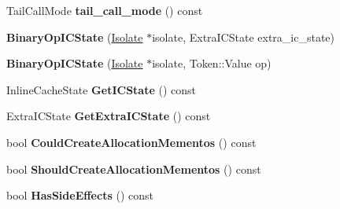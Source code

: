 \begin{DoxyCompactItemize}
\item 
Tail\+Call\+Mode {\bfseries tail\+\_\+call\+\_\+mode} () const \hypertarget{classv8_1_1internal_1_1_b_a_s_e___e_m_b_e_d_d_e_d_ad1a50ff8828b633418963d4654760353}{}\label{classv8_1_1internal_1_1_b_a_s_e___e_m_b_e_d_d_e_d_ad1a50ff8828b633418963d4654760353}

\item 
{\bfseries Binary\+Op\+I\+C\+State} (\hyperlink{classv8_1_1internal_1_1_isolate}{Isolate} $\ast$isolate, Extra\+I\+C\+State extra\+\_\+ic\+\_\+state)\hypertarget{classv8_1_1internal_1_1_b_a_s_e___e_m_b_e_d_d_e_d_af69e740d0ac5b36a5ac81724f1037f60}{}\label{classv8_1_1internal_1_1_b_a_s_e___e_m_b_e_d_d_e_d_af69e740d0ac5b36a5ac81724f1037f60}

\item 
{\bfseries Binary\+Op\+I\+C\+State} (\hyperlink{classv8_1_1internal_1_1_isolate}{Isolate} $\ast$isolate, Token\+::\+Value op)\hypertarget{classv8_1_1internal_1_1_b_a_s_e___e_m_b_e_d_d_e_d_a1c946ba234d1d11ab706121eab1367c6}{}\label{classv8_1_1internal_1_1_b_a_s_e___e_m_b_e_d_d_e_d_a1c946ba234d1d11ab706121eab1367c6}

\item 
Inline\+Cache\+State {\bfseries Get\+I\+C\+State} () const \hypertarget{classv8_1_1internal_1_1_b_a_s_e___e_m_b_e_d_d_e_d_a0e90a4dedf9d813e67f95773ce8f9f8f}{}\label{classv8_1_1internal_1_1_b_a_s_e___e_m_b_e_d_d_e_d_a0e90a4dedf9d813e67f95773ce8f9f8f}

\item 
Extra\+I\+C\+State {\bfseries Get\+Extra\+I\+C\+State} () const \hypertarget{classv8_1_1internal_1_1_b_a_s_e___e_m_b_e_d_d_e_d_af7260d1f010f4e6a7e3f6384dc5cd5ca}{}\label{classv8_1_1internal_1_1_b_a_s_e___e_m_b_e_d_d_e_d_af7260d1f010f4e6a7e3f6384dc5cd5ca}

\item 
bool {\bfseries Could\+Create\+Allocation\+Mementos} () const \hypertarget{classv8_1_1internal_1_1_b_a_s_e___e_m_b_e_d_d_e_d_a540425eb6389443930aa8d9ff7fa0279}{}\label{classv8_1_1internal_1_1_b_a_s_e___e_m_b_e_d_d_e_d_a540425eb6389443930aa8d9ff7fa0279}

\item 
bool {\bfseries Should\+Create\+Allocation\+Mementos} () const \hypertarget{classv8_1_1internal_1_1_b_a_s_e___e_m_b_e_d_d_e_d_a3ec75f8058dff0bb75f0444faea8e35a}{}\label{classv8_1_1internal_1_1_b_a_s_e___e_m_b_e_d_d_e_d_a3ec75f8058dff0bb75f0444faea8e35a}

\item 
bool {\bfseries Has\+Side\+Effects} () const \hypertarget{classv8_1_1internal_1_1_b_a_s_e___e_m_b_e_d_d_e_d_a27bba287a6480c95331a9f85fff4acdf}{}\label{classv8_1_1internal_1_1_b_a_s_e___e_m_b_e_d_d_e_d_a27bba287a6480c95331a9f85fff4acdf}


\end{DoxyCompactItemize}
